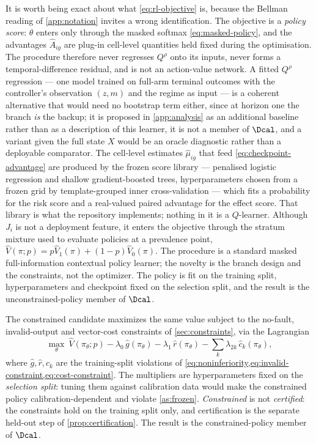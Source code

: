 It is worth being exact about what \eqref{eq:rl-objective} is, because the
Bellman reading of \cref{app:notation} invites a wrong identification.  The
objective is a \emph{policy score}: $\theta$ enters only through the masked
softmax \eqref{eq:masked-policy}, and the advantages $\widehat A_{ig}$ are
plug-in cell-level quantities held fixed during the optimisation.  The
procedure therefore never regresses $Q^\rho$ onto its inputs, never forms a
temporal-difference residual, and is not an action-value network.  A fitted
$Q^\rho$ regression --- one model trained on full-arm terminal outcomes with
the controller's observation $(z,m)$ and the regime as input --- is a coherent
alternative that would need no bootstrap term either, since at horizon one the
branch \emph{is} the backup; it is proposed in \cref{app:analysis} as an
additional baseline rather than as a description of this learner, it is not a
member of $\Dcal$, and a variant given the full state $X$ would be an oracle
diagnostic rather than a deployable comparator.  The cell-level
estimates $\widehat\mu_{ig}$ that feed \eqref{eq:checkpoint-advantage} are
produced by the frozen score library --- penalised logistic regression and
shallow gradient-boosted trees, hyperparameters chosen from a frozen grid by
template-grouped inner cross-validation --- which fits a probability for the
risk score and a real-valued paired advantage for the effect score.  That
library is what the repository implements; nothing in it is a $Q$-learner.  Although $J_i$ is not a deployment feature, it enters the
objective through the stratum mixture used to evaluate policies at a prevalence
point, $\widehat V(\pi;p)=p\widehat V_1(\pi)+(1-p)\widehat V_0(\pi)$.  The
procedure is a standard masked full-information contextual policy learner; the novelty is the
branch design and the constraints, not the optimizer.  The policy is fit on the
training split, hyperparameters and checkpoint fixed on the selection split, and
the result is the unconstrained-policy member of $\Dcal$.

The constrained candidate maximizes the same value subject to the no-fault,
invalid-output and vector-cost constraints of \cref{sec:constraints}, via the
Lagrangian
\begin{equation}
 \max_\theta\ \widehat V(\pi_\theta;p)-\lambda_0\,\hat g(\pi_\theta)-\lambda_1\,\hat r(\pi_\theta)-\sum_k\lambda_{2k}\,\hat c_k(\pi_\theta),
 \label{eq:rl-lagrangian}
\end{equation}
where $\hat g,\hat r,\hat c_k$ are the training-split violations of
\cref{eq:noninferiority,eq:invalid-constraint,eq:cost-constraint}.  The
multipliers are hyperparameters fixed on the \emph{selection split}: tuning them
against calibration data would make the constrained policy calibration-dependent
and violate \cref{as:frozen}.  \emph{Constrained} is not \emph{certified}: the
constraints hold on the training split only, and certification is the separate
held-out step of \cref{prop:certification}.  The result is the
constrained-policy member of $\Dcal$.

